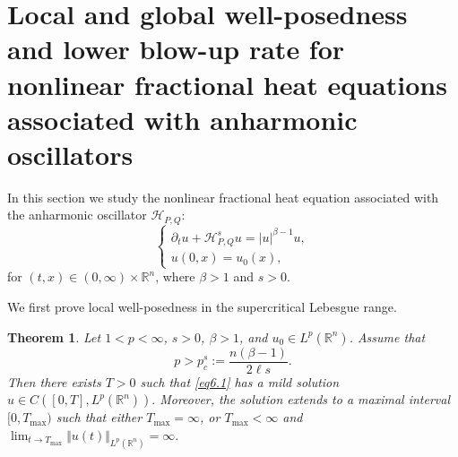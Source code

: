 \documentclass[12pt, reqno]{amsart}
\newtheorem{theorem}{Theorem}[section]
\theoremstyle{definition}
\theoremstyle{remark}
\numberwithin{equation}{section}
\newcommand{\APQ}{\mathcal{H}_{P, Q}}
\begin{document}
 \section{Local and global well-posedness and lower blow-up rate for nonlinear fractional heat equations associated with anharmonic oscillators}
\label{application}

In this section we study the nonlinear fractional heat equation associated with the anharmonic oscillator $\APQ$:
\begin{equation}
\label{eq6.1}
    \begin{cases}
        \partial_t u+\APQ^s u=|u|^{\beta-1}u,\\
        u(0,x)=u_0(x),
    \end{cases}
\end{equation}
for $(t,x)\in(0,\infty)\times\mathbb R^n$, where $\beta>1$ and $s>0$.

We first prove local well-posedness in the supercritical Lebesgue range.

\begin{theorem}
\label{them6.1}
Let $1<p<\infty$, $s>0$, $\beta>1$, and $u_0\in L^p(\mathbb R^n)$. Assume that
\[
    p>p_c^s:=\frac{n(\beta-1)}{2\ell s}.
\]
Then there exists $T>0$ such that \eqref{eq6.1} has a mild solution $ u\in C([0,T],L^p(\mathbb R^n)).$
Moreover, the solution extends to a maximal interval $[0,T_{\max})$ such that either $T_{\max}=\infty$, or $T_{\max}<\infty$ and $ \lim_{t\to T_{\max}}
    \Vert u(t)\Vert_{L^p(\mathbb R^n)}
    =
    \infty.$
\end{theorem}
\end{document}
